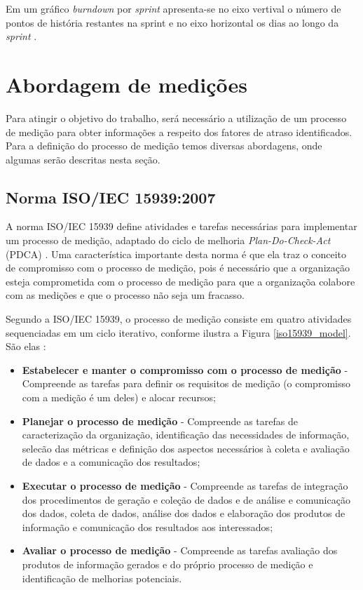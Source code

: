     Em um gráfico \textit{burndown} por \textit{sprint} apresenta-se no eixo vertival o número de pontos de história restantes na sprint e no eixo horizontal os dias ao longo da \textit{sprint} \cite{cohn06}.

\section{Abordagem de medições}

  Para atingir o objetivo do trabalho, será necessário a utilização de um processo de medição para obter informações a respeito
  dos fatores de atraso identificados. Para a definição do processo de medição temos diversas abordagens, onde algumas serão
  descritas nesta seção.
  
  \subsection{Norma ISO/IEC 15939:2007}
  
      A norma ISO/IEC 15939 define atividades e tarefas necessárias para implementar um processo de medição, adaptado do 
      ciclo de melhoria \textit{Plan-Do-Check-Act} (PDCA) \cite{iso15939}. Uma característica importante desta norma é que 
      ela traz o conceito de compromisso com o processo de medição, pois é necessário que a organização esteja comprometida
      com o processo de medição para que a organizaçõa colabore com as medições e que o processo não seja um fracasso.
      
      Segundo a ISO/IEC 15939, o processo de medição consiste em quatro atividades sequenciadas em um ciclo iterativo,
      conforme ilustra a Figura \ref{iso15939_model}. São elas \cite{iso15939}:
      
      \begin{itemize}
	
	\item \textbf{Estabelecer e manter o compromisso com o processo de medição} - Compreende as tarefas para definir os requisitos
	      de medição (o compromisso com a medição é um deles) e alocar recursos;
	      
	\item \textbf{Planejar o processo de medição} - Compreende as tarefas de caracterização da organização, identificação das 
	      necessidades de informação, selecão das métricas e definição dos aspectos necessários à coleta e avaliação de dados e 
	      a comunicação dos resultados;
	      
	\item \textbf{Executar o processo de medição} - Compreende as tarefas de integração dos procedimentos de geração e coleção
	      de dados e de análise e comunicação dos dados, coleta de dados, análise dos dados e elaboração dos produtos de
	      informação e comunicação dos resultados aos interessados;
	
	\item \textbf{Avaliar o processo de medição} - Compreende as tarefas avaliação dos produtos de informação gerados e do
	      próprio processo de medição e identificação de melhorias potenciais.
	
      \end{itemize}

